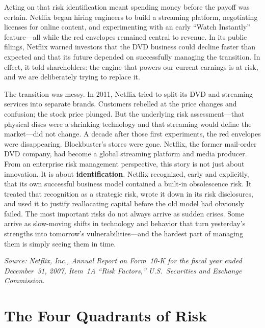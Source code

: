 \documentclass[11pt,openany]{book}
\begin{document}
\begin{corporateexample}
Acting on that risk identification meant spending money before the payoff was certain. Netflix began hiring engineers to build a streaming platform, negotiating licenses for online content, and experimenting with an early ``Watch Instantly'' feature---all while the red envelopes remained central to revenue. In its public filings, Netflix warned investors that the DVD business could decline faster than expected and that its future depended on successfully managing the transition. In effect, it told shareholders: the engine that powers our current earnings is at risk, and we are deliberately trying to replace it.

\medskip
The transition was messy. In 2011, Netflix tried to split its DVD and streaming services into separate brands. Customers rebelled at the price changes and confusion; the stock price plunged. But the underlying risk assessment---that physical discs were a shrinking technology and that streaming would define the market---did not change. A decade after those first experiments, the red envelopes were disappearing. Blockbuster's stores were gone. Netflix, the former mail-order DVD company, had become a global streaming platform and media producer.
\medskip
From an enterprise risk management perspective, this story is not just about innovation. It is about \textbf{identification}. Netflix recognized, early and explicitly, that its own successful business model contained a built-in obsolescence risk. It treated that recognition as a strategic risk, wrote it down in its risk disclosures, and used it to justify reallocating capital before the old model had obviously failed. The most important risks do not always arrive as sudden crises. Some arrive as slow-moving shifts in technology and behavior that turn yesterday's strengths into tomorrow's vulnerabilities---and the hardest part of managing them is simply seeing them in time.

\smallskip
\textit{Source: Netflix, Inc., Annual Report on Form~10-K for the fiscal year ended December~31, 2007, Item~1A ``Risk Factors,'' U.S.\ Securities and Exchange Commission.}
\end{corporateexample}

\section{The Four Quadrants of Risk}
\label{sec:four-quadrants}
\end{document}
